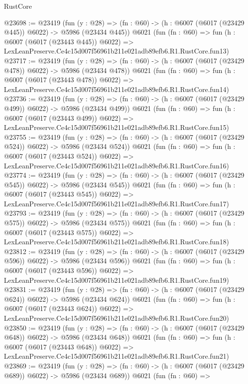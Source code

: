 \begin{lexlean}{RustCore}
\begin{coremodule}
@23698 := @23419
    (fun (y : @28) => (fn : @60) -> (h : @6007 (@6017 (@23429 @445)) @6022) -> @5986 (@23434 @445))
    @6021
    (fun (fn : @60) =>
    fun (h : @6007 (@6017 (@23443 @445)) @6022) =>
    LexLeanPreserve.Ce4c15d007f56961b211e021adb89efb6.R1.RustCore.fun13)
@23717 := @23419
    (fun (y : @28) => (fn : @60) -> (h : @6007 (@6017 (@23429 @478)) @6022) -> @5986 (@23434 @478))
    @6021
    (fun (fn : @60) =>
    fun (h : @6007 (@6017 (@23443 @478)) @6022) =>
    LexLeanPreserve.Ce4c15d007f56961b211e021adb89efb6.R1.RustCore.fun14)
@23736 := @23419
    (fun (y : @28) => (fn : @60) -> (h : @6007 (@6017 (@23429 @499)) @6022) -> @5986 (@23434 @499))
    @6021
    (fun (fn : @60) =>
    fun (h : @6007 (@6017 (@23443 @499)) @6022) =>
    LexLeanPreserve.Ce4c15d007f56961b211e021adb89efb6.R1.RustCore.fun15)
@23755 := @23419
    (fun (y : @28) => (fn : @60) -> (h : @6007 (@6017 (@23429 @524)) @6022) -> @5986 (@23434 @524))
    @6021
    (fun (fn : @60) =>
    fun (h : @6007 (@6017 (@23443 @524)) @6022) =>
    LexLeanPreserve.Ce4c15d007f56961b211e021adb89efb6.R1.RustCore.fun16)
@23774 := @23419
    (fun (y : @28) => (fn : @60) -> (h : @6007 (@6017 (@23429 @545)) @6022) -> @5986 (@23434 @545))
    @6021
    (fun (fn : @60) =>
    fun (h : @6007 (@6017 (@23443 @545)) @6022) =>
    LexLeanPreserve.Ce4c15d007f56961b211e021adb89efb6.R1.RustCore.fun17)
@23793 := @23419
    (fun (y : @28) => (fn : @60) -> (h : @6007 (@6017 (@23429 @575)) @6022) -> @5986 (@23434 @575))
    @6021
    (fun (fn : @60) =>
    fun (h : @6007 (@6017 (@23443 @575)) @6022) =>
    LexLeanPreserve.Ce4c15d007f56961b211e021adb89efb6.R1.RustCore.fun18)
@23812 := @23419
    (fun (y : @28) => (fn : @60) -> (h : @6007 (@6017 (@23429 @596)) @6022) -> @5986 (@23434 @596))
    @6021
    (fun (fn : @60) =>
    fun (h : @6007 (@6017 (@23443 @596)) @6022) =>
    LexLeanPreserve.Ce4c15d007f56961b211e021adb89efb6.R1.RustCore.fun19)
@23831 := @23419
    (fun (y : @28) => (fn : @60) -> (h : @6007 (@6017 (@23429 @624)) @6022) -> @5986 (@23434 @624))
    @6021
    (fun (fn : @60) =>
    fun (h : @6007 (@6017 (@23443 @624)) @6022) =>
    LexLeanPreserve.Ce4c15d007f56961b211e021adb89efb6.R1.RustCore.fun20)
@23850 := @23419
    (fun (y : @28) => (fn : @60) -> (h : @6007 (@6017 (@23429 @648)) @6022) -> @5986 (@23434 @648))
    @6021
    (fun (fn : @60) =>
    fun (h : @6007 (@6017 (@23443 @648)) @6022) =>
    LexLeanPreserve.Ce4c15d007f56961b211e021adb89efb6.R1.RustCore.fun21)
@23869 := @23419
    (fun (y : @28) => (fn : @60) -> (h : @6007 (@6017 (@23429 @689)) @6022) -> @5986 (@23434 @689))
    @6021
    (fun (fn : @60) =>

\end{coremodule}
\end{lexlean}

